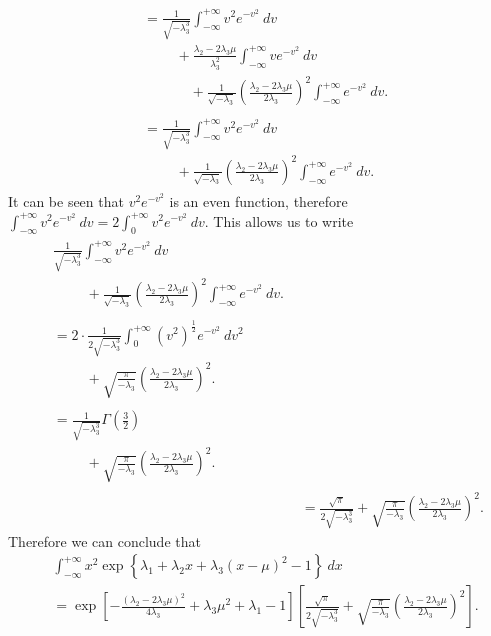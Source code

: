\begin{answer}{}
\begin{align}
		\begin{split}
			&= \frac{1}{\sqrt{-\lambda_3^3}} \int_{-\infty}^{+\infty} v^2 e^{-v^2}\ dv\\
			&\phantom{=}\quad + \frac{\lambda_2 - 2\lambda_3\mu}{\lambda_3^2}\int_{-\infty}^{+\infty} ve^{-v^2}\ dv\\
			&\phantom{=}\quad\quad + \frac{1}{\sqrt{-\lambda_3}}\left(\frac{\lambda_2 - 2\lambda_3\mu}{2\lambda_3} \right)^2 \int_{-\infty}^{+\infty} e^{-v^2}\ dv.
		\end{split}\\
		\begin{split}
			&= \frac{1}{\sqrt{-\lambda_3^3}} \int_{-\infty}^{+\infty} v^2 e^{-v^2}\ dv\\
			&\phantom{=}\quad + \frac{1}{\sqrt{-\lambda_3}}\left(\frac{\lambda_2 - 2\lambda_3\mu}{2\lambda_3} \right)^2 \int_{-\infty}^{+\infty} e^{-v^2}\ dv.
		\end{split}
	\end{align}
	It can be seen that $v^2e^{-v^2}$ is an even function, therefore $\int_{-\infty}^{+\infty} v^2 e^{-v^2}\ dv = 2\int_{0}^{+\infty}v^2 e^{-v^2}\ dv$. This allows us to write
	\begin{align}
		\begin{split}
			&\frac{1}{\sqrt{-\lambda_3^3}} \int_{-\infty}^{+\infty} v^2 e^{-v^2}\ dv\\
			&\phantom{=}\quad + \frac{1}{\sqrt{-\lambda_3}}\left(\frac{\lambda_2 - 2\lambda_3\mu}{2\lambda_3} \right)^2 \int_{-\infty}^{+\infty} e^{-v^2}\ dv.
		\end{split}\\
		\begin{split}
			&= 2\cdot\frac{1}{2\sqrt{-\lambda_3^3}} \int_{0}^{+\infty} (v^2)^{\frac{1}{2}} e^{-v^2}\ dv^2\\
			&\phantom{=}\quad + \sqrt{\frac{\pi}{-\lambda_3}}\left(\frac{\lambda_2 - 2\lambda_3\mu}{2\lambda_3} \right)^2.
		\end{split}\\
		\begin{split}
			&= \frac{1}{\sqrt{-\lambda_3^3}}\Gamma\left(\frac{3}{2}\right)\\
			&\phantom{=}\quad + \sqrt{\frac{\pi}{-\lambda_3}}\left(\frac{\lambda_2 - 2\lambda_3\mu}{2\lambda_3} \right)^2.
		\end{split}\\
		&= \frac{\sqrt{\pi}}{2\sqrt{-\lambda_3^3}} + \sqrt{\frac{\pi}{-\lambda_3}}\left(\frac{\lambda_2 - 2\lambda_3\mu}{2\lambda_3} \right)^2.
	\end{align}
	Therefore we can conclude that
	\begin{align}
		&\int_{-\infty}^{+\infty} x^2 \exp\left\{ \lambda_1 + \lambda_2 x + \lambda_3(x-\mu)^2 - 1 \right\}\ dx\\
		&= \exp\left[ -\frac{(\lambda_2 - 2\lambda_3\mu)^2}{4\lambda_3} + \lambda_3 \mu^2 + \lambda_1 - 1 \right]  \left[ \frac{\sqrt{\pi}}{2\sqrt{-\lambda_3^3}} + \sqrt{\frac{\pi}{-\lambda_3}}\left(\frac{\lambda_2 - 2\lambda_3\mu}{2\lambda_3} \right)^2 \right].
	\end{align}
	

\end{answer}

